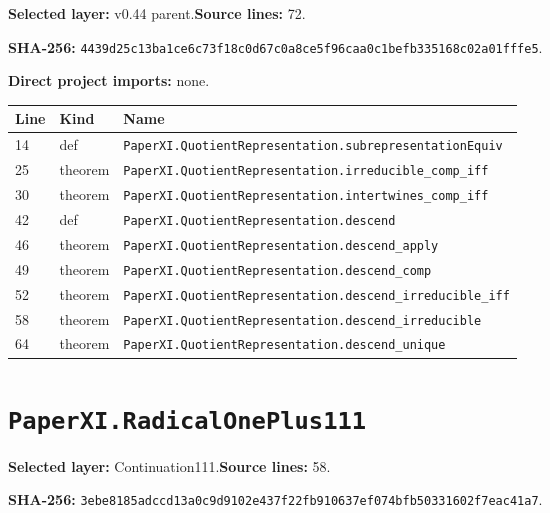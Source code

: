 \documentclass[10pt,oneside]{book}
\begin{document}
\textbf{Selected layer:} v0.44 parent.\quad\textbf{Source lines:} 72.\par\textbf{SHA-256:} {\scriptsize\nolinkurl{4439d25c13ba1ce6c73f18c0d67c0a8ce5f96caa0c1befb335168c02a01fffe5}}.


\textbf{Direct project imports:} none.

\begin{longtable}{@{}p{}p{}p{}@{}}\toprule Line&Kind&Name\\\midrule\endhead

14&def&\nolinkurl{PaperXI.QuotientRepresentation.subrepresentationEquiv}\\

25&theorem&\nolinkurl{PaperXI.QuotientRepresentation.irreducible_comp_iff}\\

30&theorem&\nolinkurl{PaperXI.QuotientRepresentation.intertwines_comp_iff}\\

42&def&\nolinkurl{PaperXI.QuotientRepresentation.descend}\\

46&theorem&\nolinkurl{PaperXI.QuotientRepresentation.descend_apply}\\

49&theorem&\nolinkurl{PaperXI.QuotientRepresentation.descend_comp}\\

52&theorem&\nolinkurl{PaperXI.QuotientRepresentation.descend_irreducible_iff}\\

58&theorem&\nolinkurl{PaperXI.QuotientRepresentation.descend_irreducible}\\

64&theorem&\nolinkurl{PaperXI.QuotientRepresentation.descend_unique}\\

\bottomrule\end{longtable}

\section{\texorpdfstring{\nolinkurl{PaperXI.RadicalOnePlus111}}{PaperXI.RadicalOnePlus111}}\label{module:PaperXI.RadicalOnePlus111}

\textbf{Selected layer:} Continuation111.\quad\textbf{Source lines:} 58.\par\textbf{SHA-256:} {\scriptsize\nolinkurl{3ebe8185adccd13a0c9d9102e437f22fb910637ef074bfb50331602f7eac41a7}}.
\end{document}
